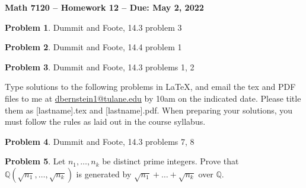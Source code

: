 \documentclass[letterpaper,11pt]{amsart}
\theoremstyle{plain}
\theoremstyle{definition}
\newtheorem{pr}{Problem}
\theoremstyle{remark}
\begin{document}
\Large

\begin{center}
{\bf Math 7120 -- Homework  12 --  Due:  May 2, 2022}
\end{center}

\normalsize

\medskip



\begin{pr}
    Dummit and Foote, 14.3 problem 3
\end{pr}

\begin{pr}
    Dummit and Foote, 14.4 problem 1
\end{pr}



\begin{pr}
    Dummit and Foote, 14.3 problems 1, 2
\end{pr}





\bigskip

Type solutions to the following problems in \LaTeX, and email the tex and PDF files to me at \url{dbernstein1@tulane.edu} by 10am on the indicated date.
Please title them as [lastname].tex and [lastname].pdf.
When preparing your solutions, you must follow the rules as laid out in the course syllabus.

\vspace{.5cm}


\begin{pr}
    Dummit and Foote, 14.3 problems 7, 8
\end{pr}

\begin{pr}
    Let $n_1,\dots,n_k$ be distinct prime integers.
    Prove that $\mathbb{Q}(\sqrt{n_1},\dots,\sqrt{n_k})$ is generated by $\sqrt{n_1}+\dots+\sqrt{n_k}$ over $\mathbb{Q}$.
\end{pr}
\end{document}
